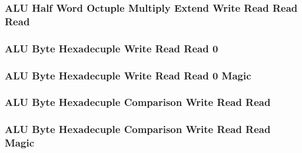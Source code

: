 

\subsubsection[{\small ALU Half Word Octuple Multiply Extend Write Read Read Read}]{ALU Half Word Octuple Multiply Extend Write Read Read Read} \label{sec:format-ALU-HOMXWRRR}



\subsubsection[{\small ALU Byte Hexadecuple Write Read Read 0}]{ALU Byte Hexadecuple Write Read Read 0} \label{sec:format-ALU-BXWRR0}



\subsubsection[{\small ALU Byte Hexadecuple Write Read Read 0 Magic}]{ALU Byte Hexadecuple Write Read Read 0 Magic} \label{sec:format-ALU-BXWRR0.M}



\subsubsection[{\small ALU Byte Hexadecuple Comparison Write Read Read}]{ALU Byte Hexadecuple Comparison Write Read Read} \label{sec:format-ALU-BXCWRR}



\subsubsection[{\small ALU Byte Hexadecuple Comparison Write Read Read Magic}]{ALU Byte Hexadecuple Comparison Write Read Read Magic} \label{sec:format-ALU-BXCWRR.M}

